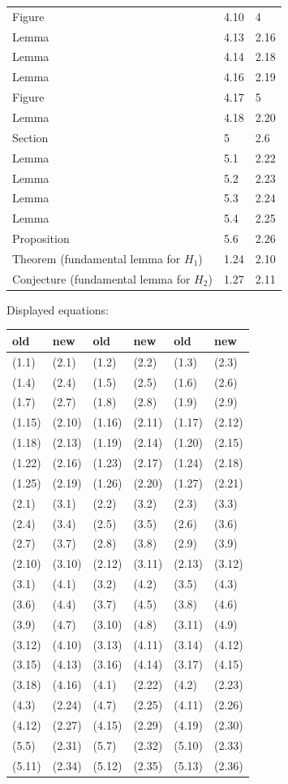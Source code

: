 \documentclass[12pt,letterpaper]{amsart}
\begin{document}
\begin{longtable}{@{}lll@{}}
Figure & 4.10 & 4\\
Lemma & 4.13 & 2.16\\
Lemma & 4.14 & 2.18\\
Lemma & 4.16 & 2.19\\
Figure & 4.17 & 5\\
Lemma & 4.18 & 2.20\\
Section & 5 & 2.6\\
Lemma & 5.1 & 2.22\\
Lemma & 5.2 & 2.23\\
Lemma & 5.3 & 2.24\\
Lemma & 5.4 & 2.25\\
Proposition & 5.6 & 2.26\\
Theorem (fundamental lemma for $H_1$) & 1.24 & 2.10\\
Conjecture (fundamental lemma for $H_2$) & 1.27 & 2.11\\
\bottomrule
\end{longtable}

Displayed equations:
\begin{longtable}{@{}ll@{\qquad}ll@{\qquad}ll@{}}
\toprule
old & new & old & new & old & new\\
\midrule
\endhead
(1.1) & (2.1) & (1.2) & (2.2) & (1.3) & (2.3)\\
(1.4) & (2.4) & (1.5) & (2.5) & (1.6) & (2.6)\\
(1.7) & (2.7) & (1.8) & (2.8) & (1.9) & (2.9)\\
(1.15) & (2.10) & (1.16) & (2.11) & (1.17) & (2.12)\\
(1.18) & (2.13) & (1.19) & (2.14) & (1.20) & (2.15)\\
(1.22) & (2.16) & (1.23) & (2.17) & (1.24) & (2.18)\\
(1.25) & (2.19) & (1.26) & (2.20) & (1.27) & (2.21)\\
(2.1) & (3.1) & (2.2) & (3.2) & (2.3) & (3.3)\\
(2.4) & (3.4) & (2.5) & (3.5) & (2.6) & (3.6)\\
(2.7) & (3.7) & (2.8) & (3.8) & (2.9) & (3.9)\\
(2.10) & (3.10) & (2.12) & (3.11) & (2.13) & (3.12)\\
(3.1) & (4.1) & (3.2) & (4.2) & (3.5) & (4.3)\\
(3.6) & (4.4) & (3.7) & (4.5) & (3.8) & (4.6)\\
(3.9) & (4.7) & (3.10) & (4.8) & (3.11) & (4.9)\\
(3.12) & (4.10) & (3.13) & (4.11) & (3.14) & (4.12)\\
(3.15) & (4.13) & (3.16) & (4.14) & (3.17) & (4.15)\\
(3.18) & (4.16) & (4.1) & (2.22) & (4.2) & (2.23)\\
(4.3) & (2.24) & (4.7) & (2.25) & (4.11) & (2.26)\\
(4.12) & (2.27) & (4.15) & (2.29) & (4.19) & (2.30)\\
(5.5) & (2.31) & (5.7) & (2.32) & (5.10) & (2.33)\\
(5.11) & (2.34) & (5.12) & (2.35) & (5.13) & (2.36)\\
\bottomrule
\end{longtable}
\end{document}
